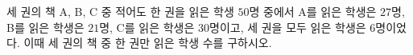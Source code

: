 세 권의 책 A, B, C 중 적어도 한 권을 읽은 학생 $50$명 중에서 A를 읽은 학생은 $27$명, B를 읽은 학생은 $21$명, C를 읽은 학생은 $30$명이고, 세 권을 모두 읽은 학생은 $6$명이었다. 이때 세 권의 책 중 한 권만 읽은 학생 수를 구하시오.

